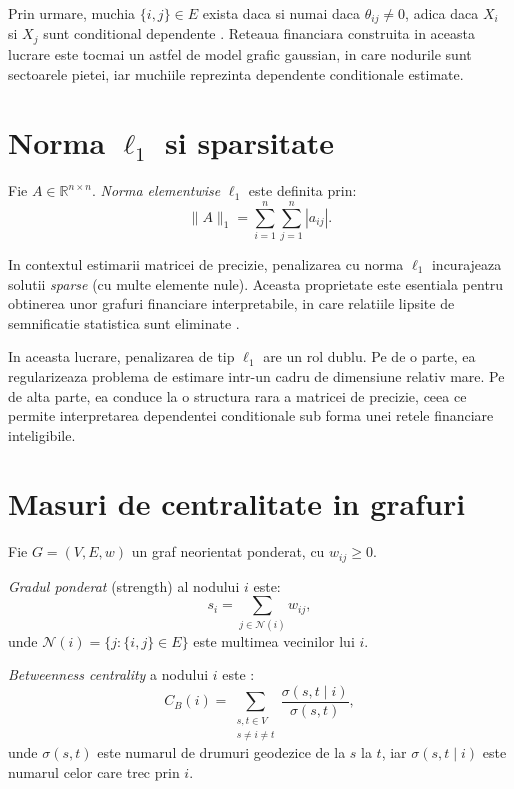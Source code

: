 Prin urmare, muchia $\{i,j\} \in E$ exista daca si numai daca $\theta_{ij} \neq 0$,
adica daca $X_i$ si $X_j$ sunt conditional dependente \citep{lauritzen1996}.
Reteaua financiara construita in aceasta lucrare este tocmai un astfel de model
grafic gaussian, in care nodurile sunt sectoarele pietei, iar muchiile reprezinta
dependente conditionale estimate.

\section{\texorpdfstring{Norma $\ell_1$}{Norma l1} si sparsitate}

Fie $A \in \mathbb{R}^{n \times n}$. \textit{Norma elementwise} $\ell_1$ este
definita prin:
\[
    \|A\|_1 = \sum_{i=1}^n \sum_{j=1}^n |a_{ij}|.
\]

In contextul estimarii matricei de precizie, penalizarea cu norma $\ell_1$
incurajeaza solutii \textit{sparse} (cu multe elemente nule). Aceasta proprietate
este esentiala pentru obtinerea unor grafuri financiare interpretabile, in care
relatiile lipsite de semnificatie statistica sunt eliminate \citep{friedman2008}.

\begin{remark}
In aceasta lucrare, penalizarea de tip $\ell_1$ are un rol dublu. Pe de o parte,
ea regularizeaza problema de estimare intr-un cadru de dimensiune relativ mare.
Pe de alta parte, ea conduce la o structura rara a matricei de precizie, ceea ce
permite interpretarea dependentei conditionale sub forma unei retele financiare
inteligibile.
\end{remark}

\section{Masuri de centralitate in grafuri}

Fie $G = (V, E, w)$ un graf neorientat ponderat, cu $w_{ij} \geq 0$.

\begin{definition}
\textit{Gradul ponderat} (strength) al nodului $i$ este:
\[
    s_i = \sum_{j \in \mathcal{N}(i)} w_{ij},
\]
unde $\mathcal{N}(i) = \{j : \{i,j\} \in E\}$ este multimea vecinilor lui $i$.
\end{definition}

\begin{definition}
\textit{Betweenness centrality} a nodului $i$ este \citep{freeman1977}:
\[
    C_B(i) = \sum_{\substack{s,t \in V \\ s \neq i \neq t}}
    \frac{\sigma(s,t \mid i)}{\sigma(s,t)},
\]
unde $\sigma(s,t)$ este numarul de drumuri geodezice de la $s$ la $t$, iar
$\sigma(s,t \mid i)$ este numarul celor care trec prin $i$.
\end{definition}

